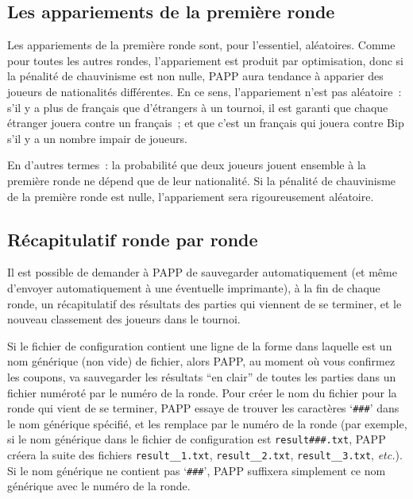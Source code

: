 \documentclass[10pt]{article}
\begin{document}
\subsection{Les appariements de la première ronde}

	Les appariements de la première ronde sont, pour l'essentiel,
aléatoires.  Comme pour toutes les autres rondes, l'appariement est
produit par optimisation, donc si la pénalité de chauvinisme est non
nulle, PAPP aura tendance à apparier des joueurs de nationalités
différentes.  En ce sens, l'appariement n'est pas aléatoire~: s'il y
a plus de fran{\c c}ais que d'étrangers à un tournoi, il est garanti
que chaque étranger jouera contre un fran{\c c}ais~; et que c'est un
fran{\c c}ais qui jouera contre Bip s'il y a un nombre impair de
joueurs. 

	En d'autres termes~: la probabilité que deux joueurs jouent
ensemble à la première ronde ne dépend que de leur nationalité. 
Si la pénalité de chauvinisme de la première ronde est nulle,
l'appariement sera rigoureusement aléatoire. 

\subsection{Récapitulatif ronde par ronde}

Il est possible de demander à PAPP de sauvegarder automatiquement 
(et même d'envoyer automatiquement à une éventuelle imprimante), 
à la fin de chaque ronde, un récapitulatif des résultats des 
parties qui viennent de se terminer, et le nouveau classement des 
joueurs dans le tournoi.

 Si le fichier de configuration contient une ligne de la forme 
\medbreak
{}
\medbreak
\noindent dans laquelle  est un nom générique (non 
vide) de fichier, alors PAPP, au moment o\`u vous confirmez les 
coupons, va sauvegarder les résultats ``en clair'' de toutes les 
parties dans un fichier numéroté par le numéro de la ronde.  
Pour créer le nom du fichier pour la ronde qui vient de se terminer, 
PAPP essaye de trouver les caractères `\verb|###|' dans le nom 
générique spécifié, et les remplace par le numéro de la 
ronde (par exemple, si le nom générique dans le fichier de 
configuration est \verb|result###.txt|, PAPP créera la suite des 
fichiers \verb|result__1.txt|, \verb|result__2.txt|, 
\verb|result__3.txt|, \emph{etc.}).  Si le nom générique ne 
contient pas `\verb|###|', PAPP suffixera simplement ce nom 
générique avec le numéro de la ronde.
\end{document}
